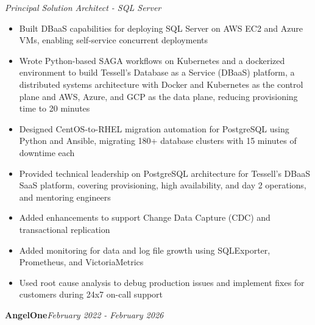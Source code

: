 \documentclass[10pt,a4paper]{article}
\begin{document}
\textit{Principal Solution Architect - SQL Server}\\[-5pt]
\begin{itemize}
  \item Built DBaaS capabilities for deploying SQL Server on AWS EC2 and Azure VMs, enabling self-service concurrent deployments
  \item Wrote Python-based SAGA workflows on Kubernetes and a dockerized environment to build Tessell's Database as a Service (DBaaS) platform, a distributed systems architecture with Docker and Kubernetes as the control plane and AWS, Azure, and GCP as the data plane, reducing provisioning time to 20 minutes
  \item Designed CentOS-to-RHEL migration automation for PostgreSQL using Python and Ansible, migrating 180+ database clusters with 15 minutes of downtime each
  \item Provided technical leadership on PostgreSQL architecture for Tessell's DBaaS SaaS platform, covering provisioning, high availability, and day 2 operations, and mentoring engineers
  \item Added enhancements to support Change Data Capture (CDC) and transactional replication
  \item Added monitoring for data and log file growth using SQLExporter, Prometheus, and VictoriaMetrics
  \item Used root cause analysis to debug production issues and implement fixes for customers during 24x7 on-call support
\end{itemize}
\vspace{14.7pt}
\noindent\textbf{AngelOne}\hfill \textit{February 2022 - February 2026}
\end{document}
